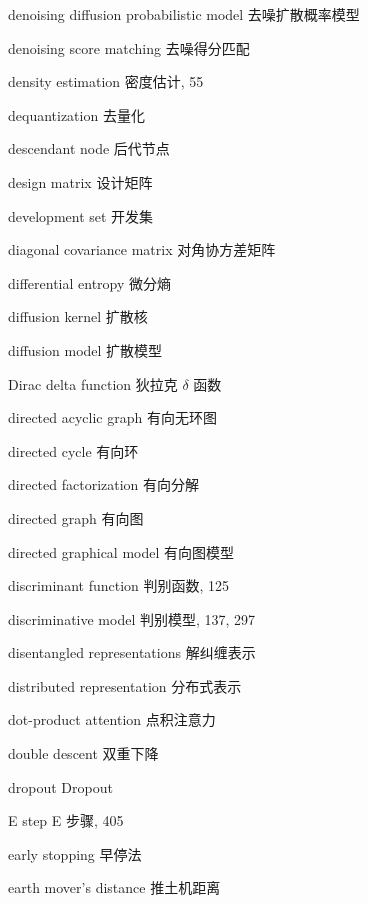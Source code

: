 denoising diffusion probabilistic model 去噪扩散概率模型\par
denoising score matching 去噪得分匹配\par
density estimation 密度估计, 55\par
dequantization 去量化\par
descendant node 后代节点\par
design matrix 设计矩阵\par
development set 开发集\par
diagonal covariance matrix 对角协方差矩阵\par
differential entropy 微分熵\par
diffusion kernel 扩散核\par
diffusion model 扩散模型\par
Dirac delta function 狄拉克 $\delta$ 函数\par
directed acyclic graph 有向无环图\par
directed cycle 有向环\par
directed factorization 有向分解\par
directed graph 有向图\par
directed graphical model 有向图模型\par
discriminant function 判别函数, 125\par
discriminative model 判别模型, 137, 297\par
disentangled representations 解纠缠表示\par
distributed representation 分布式表示\par
dot-product attention 点积注意力\par
double descent 双重下降\par
dropout Dropout\par
E step E 步骤, 405\par
early stopping 早停法\par
earth mover’s distance 推土机距离\par

